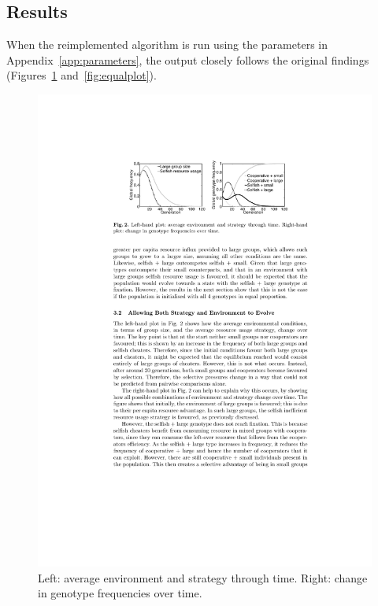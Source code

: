 \documentclass[11pt]{article}
\begin{document}
\subsection{Results}
When the reimplemented algorithm is run using the parameters in Appendix~\ref{app:parameters}, the output closely follows the original findings (Figures~\ref{fig:original} and~\ref{fig:equalplot}).
\vspace{-.5cm}
\begin{figure}[!ht]
  \centering
  \includegraphics[scale=1.25]{original.pdf}
  \caption{Left: average environment and strategy through time. \newline Right: change in genotype frequencies over time. \citep{orig} }
  \label{fig:original}
\end{figure}
\end{document}
